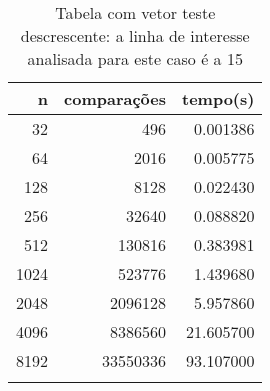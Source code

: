 \begin{table}[ht]
\centering
\begin{tabular}{rrr} \toprule
        n &    comparações &       tempo(s) \\ \midrule
      32  &            496 &      0.001386 \\
      64  &           2016 &      0.005775 \\
     128  &           8128 &      0.022430 \\
     256  &          32640 &      0.088820 \\
     512  &         130816 &      0.383981 \\
    1024  &         523776 &      1.439680 \\
    2048  &        2096128 &      5.957860 \\
    4096  &        8386560 &     21.605700 \\
    8192  &       33550336 &     93.107000 \\
\bottomrule\addlinespace
\end{tabular}
\caption{Tabela com vetor teste descrescente: a linha de interesse analisada para este caso é a 15}
\label{tab:bolhaDecrescente}
\end{table}
